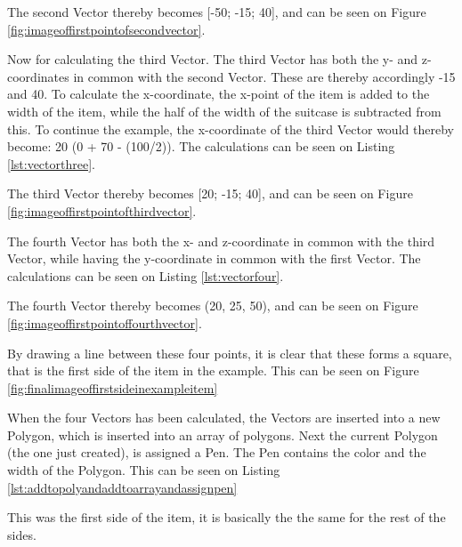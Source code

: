 
The second Vector thereby becomes [-50; -15; 40], and can be seen on Figure \ref{fig:imageoffirstpointofsecondvector}.

Now for calculating the third Vector. The third Vector has both the y- and z- coordinates in common with the second Vector. These are thereby accordingly -15 and 40. 
To calculate the x-coordinate, the x-point of the item is added to the width of the item, while the half of the width of the suitcase is subtracted from this. To continue the example, the x-coordinate of the third Vector would thereby become: 20 (0 + 70 - (100/2)). The calculations can be seen on Listing \ref{lst:vectorthree}.


The third Vector thereby becomes [20; -15; 40], and can be seen on Figure \ref{fig:imageoffirstpointofthirdvector}.


The fourth Vector has both the x- and z-coordinate in common with the third Vector, while having the y-coordinate in common with the first Vector. The calculations can be seen on Listing \ref{lst:vectorfour}.


The fourth Vector thereby becomes (20, 25, 50), and can be seen on Figure \ref{fig:imageoffirstpointoffourthvector}.


By drawing a line between these four points, it is clear that these forms a square, that is the first side of the item in the example. This can be seen on Figure \ref{fig:finalimageoffirstsideinexampleitem}

When the four Vectors has been calculated, the Vectors are inserted into a new Polygon, which is inserted into an array of polygons.  Next the current Polygon (the one just created), is assigned a Pen. The Pen contains the color and the width of the Polygon. This can be seen on Listing \ref{lst:addtopolyandaddtoarrayandassignpen}


This was the first side of the item, it is basically the the same for the rest of the sides. 

